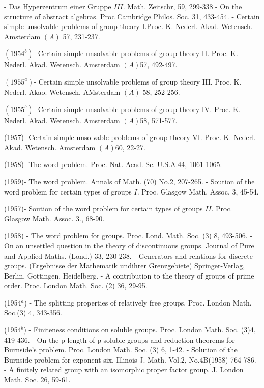 \begin{thebibliography}{99}
\pageoriginale - Das Hyperzentrum einer Gruppe
  $III$. Math. Zeitschr, 59, 299-338 
- On the structure of abstract
  algebras. Proc Cambridge Philos. Soc. 31, 433-454. 
- Certain simple uusolvable
  problems of group theory
  I.Proc. K. Nederl. Akad. Wetensch. Amsterdam $(A)$ 57, 231-237. 

  $(1954^b)$- Certain simple unsolvable problems of group
  theory II. Proc. K. Nederl. Akad. Wetensch. Amsterdam $(A)$57,
  492-497. 

  $(1955^a)$- Certain simple unsolvable problems of group
  theory III. Proc. K. Nederl. Akao. Wetensch. AMsterdam $(A)$ 58,
  252-256. 

  $(1955^b)$- Certain simple unsolvable problems of group
  theory IV. Proc. K. Nederl. Akad. Wetensch. Amsterdam $(A)$58,
  571-577. 

  (1957)- Certain simple unsolvable problems of group
  theory VI. Proc. K. Nederl. Akad. Wetensch. Amsterdam $(A)$60,
  22-27.
 
  (1958)- The word
  problem. Proc. Nat. Acad. Sc. U.S.A.44, 1061-1065. 

  (1959)- The word problem. Annals of Math. (70) No.2,
  207-265. 
- Soution of the word problem for
  certain types of groups $I$. Proc. Glasgow Math. Assoc. 3, 45-54. 

  (1957)- Soution of the word problem for certain types
  of groups $II$. Proc. Glasgow Math. Assoc. 3., 68-90. 

  (1958) - The word problem for
  groups. Proc. Lond. Math. Soc. (3) 8, 493-506. 
\pageoriginale - On an unsettled question in the
  theory of discontinuous groups. Journal of Pure and Applied
  Maths. (Lond.) 33, 230-238. 
 - Generators and
  relations for discrete groups. (Ergebnisse der Mathematik undihrer
  Grenzgebiete) Springer-Verlag, Berlin, Gottingen, Heidelberg. 
 - A contribution to the theory of groups
  of prime order. Proc. London Math. Soc. (2) 36, 29-95. 

  (1954$^a$) - The splitting properties of relatively
  free groups. Proc. London Math. Soc.(3) 4, 343-356. 

  (1954$^b$) - Finiteness conditions on soluble
  groups. Proc. London Math. Soc. (3)4, 419-436. 
- On the p-length of
  p-soluble groups and reduction theorems for Burnside's
  problem. Proc. London Math. Soc. (3) 6, 1-42. 
- Solution of the Burnside problem
  for exponent six. Illinois J. Math. Vol.2, No.4B(1958) 764-786. 
- A finitely related group with an
  isomorphic proper factor group. J. London Math. Soc. 26, 59-61. 


\end{thebibliography}
